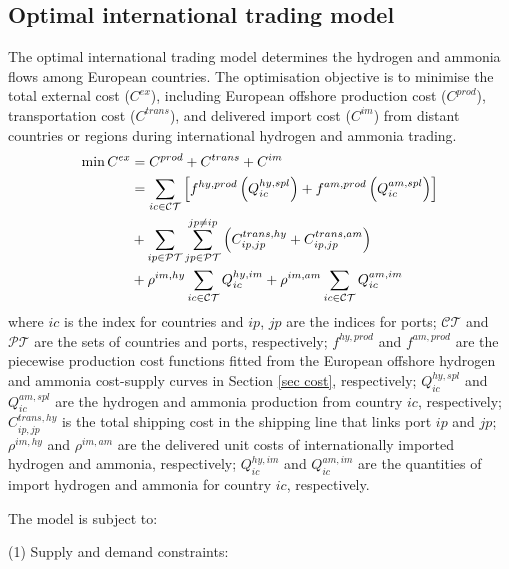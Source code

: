 \documentclass[sn-mathphys,Numbered]{sn-jnl}%
\theoremstyle{plain}%
\theoremstyle{definition}%
\theoremstyle{remark}%
\begin{document}
\subsection{Optimal international trading model}

The optimal international trading model determines the hydrogen and ammonia flows among European countries. The optimisation objective is to minimise the total external cost ($C^{ex}$), including European offshore production cost ($C^{prod}$), transportation cost ($C^{trans}$), and delivered import cost ($C^{im}$) from distant countries or regions during international hydrogen and ammonia trading.
\begin{align}
    \min C^{ex} & = C^{prod} + C^{trans} + C^{im}
    \notag \\
    & = \sum_{ic \in \mathcal{CT}} \left[
    f^{hy,prod}\left(Q_{ic}^{hy,spl}\right)
    + f^{am,prod}\left(Q_{ic}^{am,spl}\right)
    \right]
     \notag\\
     & + \sum_{ip \in \mathcal{PT}} \sum_{jp \in \mathcal{PT}}^{jp \neq ip}
     \left(C_{ip,jp}^{trans,hy} + C_{ip,jp}^{trans,am}\right)
     \notag\\
     & + \rho^{im,hy} \sum_{ic \in \mathcal{CT}}Q_{ic}^{hy,im}
     + \rho^{im,am} \sum_{ic \in \mathcal{CT}}Q_{ic}^{am,im}
\end{align}
where $ic$ is the index for countries and $ip$, $jp$ are the indices for ports; $\mathcal{CT}$ and $\mathcal{PT}$ are the sets of countries and ports, respectively; $f^{hy,prod}$ and $f^{am,prod}$ are the piecewise production cost functions fitted from the European offshore hydrogen and ammonia cost-supply curves in Section \ref{sec cost}, respectively; $Q_{ic}^{hy,spl}$ and $Q_{ic}^{am,spl}$ are the hydrogen and ammonia production from country $ic$, respectively; $C_{ip,jp}^{trans,hy}$ is the total shipping cost in the shipping line that links port $ip$ and $jp$; $\rho^{im,hy}$ and $\rho^{im,am}$ are the delivered unit costs of internationally imported hydrogen and ammonia, respectively; $Q_{ic}^{hy,im}$ and $Q_{ic}^{am,im}$ are the quantities of import hydrogen and ammonia for country $ic$, respectively.

The model is subject to:

(1) Supply and demand constraints:
\end{document}
